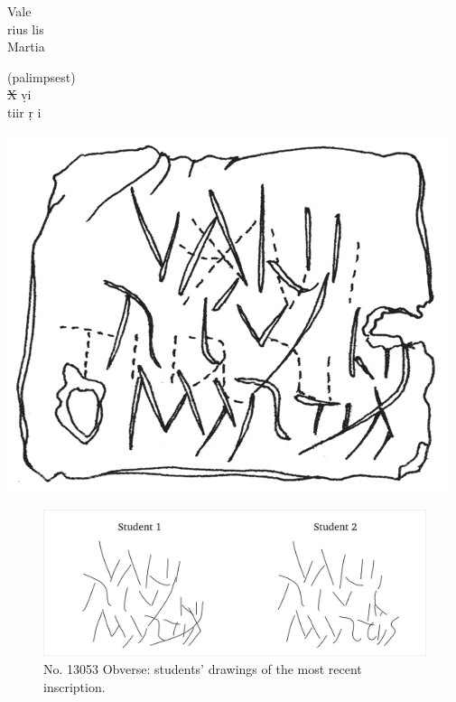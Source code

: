 \documentclass[amsthm,ebook]{saparticle}
\begin{document}
\begin{minipage}[t]{0.3\textwidth}
Vale\\
rius lis\\
Martia\\
\end{minipage}
\begin{minipage}[t]{0.3\textwidth}
(palimpsest)\\
\sout{X} \d{v}i\\
tiir \d{r} i\\
\end{minipage}
\begin{minipage}[c]{0.3\textwidth}
\includegraphics[scale=0.20]{EAGLE16lameetalteaching-img011a.png}
\end{minipage}



\begin{figure}[!hbp]
\centering
\includegraphics[scale=0.25]{EAGLE16lameetalteaching-img010.png}
\caption{No. 13053 Obverse: students' drawings of the most recent inscription.}
\label{fig:3}
\end{figure}
\end{document}
